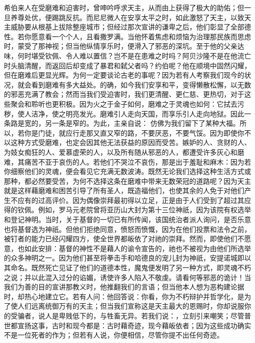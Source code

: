 希伯来人在受磨难和迫害时，曾呻吟呼求天主，从而由上获得了极大的助佑；但一旦养尊处优，便踢跳反抗。而尼尼微人在安享太平之时，如此激怒了天主，以致天主威胁要从根基上拔除整座城市；但经过那次宣讲的谦卑之后，他们彰显了全部德性。若你愿意看一个个人，且看撒罗满。当他怀着焦虑和烦恼为治理那民族而思虑时，蒙受了那神视；但当他纵情享乐时，便滑入了邪恶的深坑。至于他的父亲达味，何时堪受钦佩、令人难以置信？岂不是在患难之时吗？阿贝沙隆不是在他流亡时头脑清醒，而返回后却变成了暴君和弑父者吗？约伯呢？他在顺境中固然闪耀，但在磨难后更显光辉。为何一定要谈论古老的事呢？因为若有人考察我们现今的状况，就会看到磨难有多大益处。的确，如今我们安享和平，变得懒散松懈，以无数的邪恶充满了教会；然而当我们受迫害时，我们更清醒、更仁慈、更热切，对于这些聚会和聆听也更积极。因为火之于金子如何，磨难之于灵魂也如何：它拭去污秽，使人洁净，使之明亮发光。磨难引人走向天国，而享乐引人走向地狱。因此一条路是宽的，另一条是窄的。为此，主亲自说： 仿佛为我们留下了某种大福。所以，若你是门徒，就应行走那又直又窄的路，不要厌恶，不要气馁。因为即使你不以这种方式受磨难，也定会因其他无法获益的原因而受苦。嫉妒的人、贪财的人、为妓女痴狂的人、爱慕虚荣的人，以及所有随从邪恶的人，都遭受许多灰心和磨难，其痛苦不亚于哀伤的人。若他们不哭泣不哀伤，那是出于羞耻和麻木：因为若你细察他们的灵魂，便会看见它充满无数波涛。既然无论我们选择这种生活方式或那种，都必然要受苦，为何不选择这条在磨难中带来无数荣冠的道路呢？因为天主就是这样藉磨难和困苦引导了所有圣人，既造福他们，也使其余的人免于对他们产生不应有的过高评价。因为偶像崇拜最初得以立足，正是由于人们受到了超过其应得的钦佩。例如，罗马元老院曾将亚历山大封为第十三位神祇，因为该院有权选举和登记神明。当时，关于基督的一切已有所传闻，该国统治者派人询问，是否乐意也将基督选为神祇。但他们拒绝同意，愤怒而愤慨，因为在他们投票和法令之前，被钉者的能力已经闪耀四方，使全世界都皈依了对祂的崇拜。然而，即使他们不愿意，也如此安排：基督的神性不是藉人的谕令宣告的，祂也不被视为由他们所选举的众多神明之一。因为他们甚至将拳击手和哈德良的宠儿封为神祇，安提诺城即以其命名。既然死亡见证了他们的道德本性，魔鬼便发明了另一种方式，即灵魂不朽之说；并以此混入过分的谄媚，诱使许多人陷入不敬虔。请看何等邪恶的诡计！当我们为善的目的宣讲那教义时，他推翻我们的言语；但当他本人想为恶构建论据时，却热心地建立它。若有人问：他回答说：你看，你为不朽辩护并哲学化，是为了使人们远离统御万有的天主；但当我们宣称这是天主最大的恩赐时，你却说服你的受骗者，说人是卑贱低下的，与牲畜无异。若我们说：，立刻引来嘲笑；尽管普世都宣扬这事，古时和现今都是：古时藉奇迹，现今藉皈依者；因为这些成功确实不是一位死者的作为；但若有人说，你便相信，尽管你提不出任何奇迹。\par

